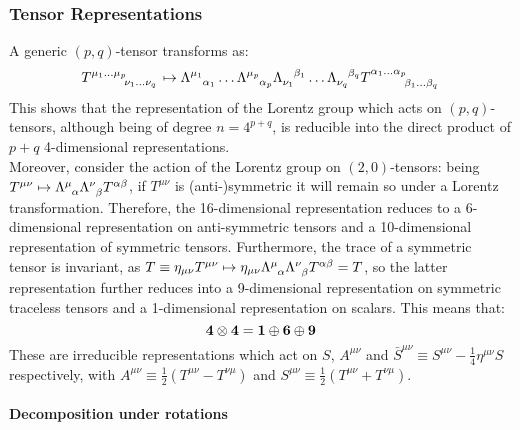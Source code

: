 \subsubsection{Tensor Representations}

A generic $ (p,q) $-tensor transforms as:
\begin{equation}
  \tensor{T}{^{\mu_1 \dots \mu_p}_{\nu_1 \dots \nu_q}} \mapsto \tensor{\Lambda}{^{\mu_1}_{\alpha_1}} \dots \tensor{\Lambda}{^{\mu_p}_{\alpha_p}} \tensor{\Lambda}{_{\nu_1}^{\beta_1}} \dots \tensor{\Lambda}{_{\nu_q}^{\beta_q}} \tensor{T}{^{\alpha_1 \dots \alpha_p}_{\beta_1 \dots \beta_q}}
\end{equation}
This shows that the representation of the Lorentz group which acts on $ (p,q) $-tensors, although being of degree $ n = 4^{p + q} $, is reducible into the direct product of $ p + q $ 4-dimensional representations.\\
Moreover, consider the action of the Lorentz group on $ (2,0) $-tensors: being $ T^{\mu \nu} \mapsto \tensor{\Lambda}{^\mu_\alpha} \tensor{\Lambda}{^\nu_\beta} T^{\alpha \beta} $, if $ T^{\mu \nu} $ is (anti-)symmetric it will remain so under a Lorentz transformation. Therefore, the 16-dimensional representation reduces to a 6-dimensional representation on anti-symmetric tensors and a 10-dimensional representation of symmetric tensors. Furthermore, the trace of a symmetric tensor is invariant, as $ T \equiv \eta_{\mu \nu} T^{\mu \nu} \mapsto \eta_{\mu \nu} \tensor{\Lambda}{^\mu _\alpha} \tensor{\Lambda}{^\nu _\beta} T^{\alpha \beta} = T $, so the latter representation further reduces into a 9-dimensional representation on symmetric traceless tensors and a 1-dimensional representation on scalars. This means that:
\begin{equation}
  \mathbf{4} \otimes \mathbf{4} = \mathbf{1} \oplus \mathbf{6} \oplus \mathbf{9}
  \label{eq:lor-tens-dec}
\end{equation}
These are irreducible representations which act on $ S $, $ A^{\mu \nu} $ and $ \bar{S}^{\mu \nu} \equiv S^{\mu \nu} - \frac{1}{4} \eta^{\mu \nu} S $ respectively, with $ A^{\mu \nu} \equiv \frac{1}{2} \left( T^{\mu \nu} - T^{\nu \mu} \right) $ and $ S^{\mu \nu} \equiv \frac{1}{2} \left( T^{\mu \nu} + T^{\nu \mu} \right) $.

\paragraph{Decomposition under rotations}

